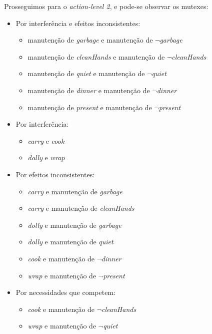 \documentclass[12pt,letterpaper]{article}
\begin{document}
	Prosseguimos para o \textit{action-level 2}, e pode-se observar os mutexes:

	\begin{itemize}
		\item Por interferência e efeitos inconsistentes:
		\begin{itemize}
			\item manutenção de \textit{garbage} e manutenção de \textit{$\lnot$garbage}
			\item manutenção de \textit{cleanHands} e manutenção de \textit{$\lnot$cleanHands}
			\item manutenção de \textit{quiet} e manutenção de \textit{$\lnot$quiet}
			\item manutenção de \textit{dinner} e manutenção de \textit{$\lnot$dinner}
			\item manutenção de \textit{present} e manutenção de \textit{$\lnot$present}
		\end{itemize}
		\item Por interferência:
		\begin{itemize}
			\item \textit{carry} e \textit{cook}
			\item \textit{dolly} e \textit{wrap}
		\end{itemize}
		\item Por efeitos inconsistentes:
		\begin{itemize}
			\item \textit{carry} e manutenção de \textit{garbage}
			\item \textit{carry} e manutenção de \textit{cleanHands}
			\item \textit{dolly} e manutenção de \textit{garbage}
			\item \textit{dolly} e manutenção de \textit{quiet}
			\item \textit{cook} e manutenção de \textit{$\lnot$dinner}
			\item \textit{wrap} e manutenção de \textit{$\lnot$present}
		\end{itemize}
		\item Por necessidades que competem:
		\begin{itemize}
			\item \textit{cook} e manutenção de \textit{$\lnot$cleanHands}
			\item \textit{wrap} e manutenção de \textit{$\lnot$quiet}
		\end{itemize}
	\end{itemize}
\end{document}
